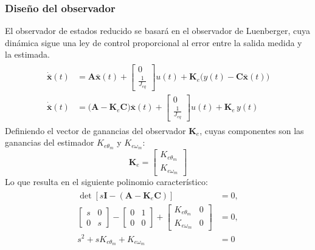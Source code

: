 \documentclass[12pt, a4paper,journal, onecolumn, compsoc]{IEEEtran}
\begin{document}
\subsubsection{Diseño del observador}
    El observador de estados reducido se basará en el observador de Luenberger, cuya dinámica sigue una ley de control proporcional al error entre la salida medida y la estimada.
    \begin{gather*}
    \begin{aligned}
    \dot{\bar{\bm{x}}}(t)&=
    \bm{A}\bar{\bm{x}}(t) +
    \begin{bmatrix}
    0 \\ \frac{1}{J_{eq}}
    \end{bmatrix}u(t)+
    \bm{K}_e\big(y(t)-\bm{C}\bar{\bm{x}}(t)\big)\\
    \dot{\bar{\bm{x}}}(t)&=
    \big(\bm{A}-\bm{K}_e\bm{C}\big)\bar{\bm{x}}(t) +
    \begin{bmatrix}
    0 \\ \frac{1}{J_{eq}}
    \end{bmatrix}u(t)+\bm{K}_e\,y(t)
    \end{aligned}
    \end{gather*}
    Definiendo el vector de ganancias del observador $\bm{K}_e$, cuyas componentes son las ganancias del estimador $K_{e\theta_m}$ y $K_{e\omega_m}$:
    \begin{equation*}
        \bm{K}_e=
        \begin{bmatrix}
            K_{e\theta_m}\\
            K_{e\omega_m}
        \end{bmatrix}
    \end{equation*}
    Lo que resulta en el siguiente polinomio característico:
    \begin{gather*}
    \begin{aligned}
        \det\!\left[s\bm{I}-\left(\bm{A}-\bm{K}_e\bm{C}\right)\right]&=0,\\
        \begin{bmatrix}
            s & 0 \\ 
            0 & s
        \end{bmatrix}-
        \begin{bmatrix}
            0 & 1 \\
            0 & 0
        \end{bmatrix}+
        \begin{bmatrix}
            K_{e\theta_m} & 0 \\
            K_{e\omega_m} & 0
        \end{bmatrix} &=0,
        \\
        s^2 + s K_{e\theta_m}+K_{e\omega_m}&=0
    \end{aligned}
    \end{gather*}
\end{document}

